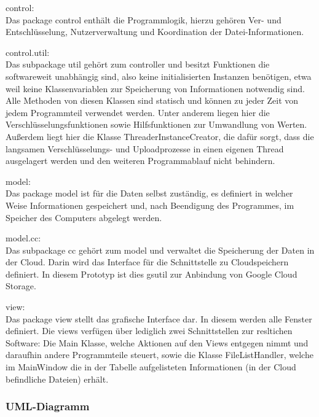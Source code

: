 \documentclass[12pt,a4paper,bibliography=totocnumbered,listof=totocnumbered]{scrartcl}
\begin{document}
\begin{compactitem}
	\item control:\\
	Das package control enthält die Programmlogik, hierzu gehören Ver- und Entschlüsselung, Nutzerverwaltung und Koordination der Datei-Informationen.
	\item control.util:\\
	Das subpackage util gehört zum controller und besitzt Funktionen die softwareweit unabhängig sind, also keine initialisierten Instanzen benötigen, etwa weil keine Klassenvariablen zur Speicherung von Informationen notwendig sind. Alle Methoden von 	diesen Klassen sind statisch und können zu jeder Zeit von jedem Programmteil verwendet werden. Unter anderem liegen hier die Verschlüsselungsfunktionen sowie Hilfsfunktionen zur Umwandlung von Werten.  Außerdem liegt hier die Klasse 				ThreaderInstanceCreator, die dafür sorgt, dass die langsamen Verschlüsselungs- und Uploadprozesse in einen eigenen Thread ausgelagert werden und den weiteren Programmablauf nicht behindern.
	\item model:\\
	Das package model ist für die Daten selbst zuständig, es definiert in welcher Weise Informationen gespeichert und, nach Beendigung des Programmes, im Speicher des Computers abgelegt werden.
	\item model.cc:\\
	Das subpackage cc gehört zum model und verwaltet die Speicherung der Daten in der Cloud. Darin wird das Interface für die Schnittstelle zu Cloudspeichern definiert. In diesem Prototyp ist dies gsutil zur Anbindung von Google Cloud Storage.
	\item view:\\
	Das package view stellt das grafische Interface dar. In diesem werden alle Fenster definiert. Die views verfügen über lediglich zwei Schnittstellen zur resltichen Software: Die Main Klasse, welche Aktionen auf den Views entgegen nimmt und daraufhin 		andere Programmteile steuert, sowie die Klasse FileListHandler, welche im MainWindow die in der Tabelle aufgelisteten Informationen (in der Cloud befindliche Dateien) erhält.
\end{compactitem}
\subsubsection{UML-Diagramm}

\pagebreak
\end{document}

